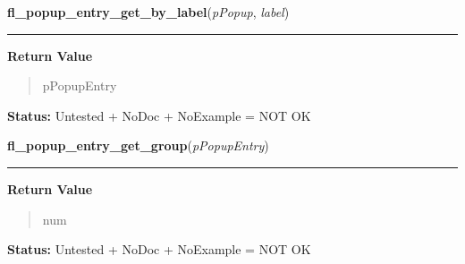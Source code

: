     \label{xformslib:library:fl_popup_entry_get_by_label}

    \vspace{0.5ex}

\hspace{.8\funcindent}\begin{boxedminipage}{\funcwidth}

    \raggedright \textbf{fl\_popup\_entry\_get\_by\_label}(\textit{pPopup}, \textit{label})

    \vspace{-1.5ex}

    \rule{\textwidth}{0.5\fboxrule}
\setlength{\parskip}{2ex}
\setlength{\parskip}{1ex}
      \textbf{Return Value}
    \vspace{-1ex}

      \begin{quote}
      pPopupEntry

      \end{quote}

\textbf{Status:} Untested + NoDoc + NoExample = NOT OK



    \end{boxedminipage}

    \label{xformslib:library:fl_popup_entry_get_group}

    \vspace{0.5ex}

\hspace{.8\funcindent}\begin{boxedminipage}{\funcwidth}

    \raggedright \textbf{fl\_popup\_entry\_get\_group}(\textit{pPopupEntry})

    \vspace{-1.5ex}

    \rule{\textwidth}{0.5\fboxrule}
\setlength{\parskip}{2ex}
\setlength{\parskip}{1ex}
      \textbf{Return Value}
    \vspace{-1ex}

      \begin{quote}
      num

      \end{quote}

\textbf{Status:} Untested + NoDoc + NoExample = NOT OK



    \end{boxedminipage}

